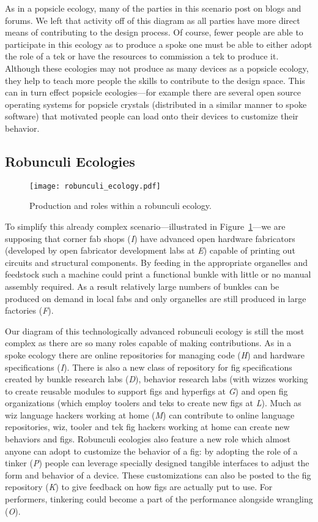 As in a popsicle ecology, many of the parties in this scenario post on blogs and forums. We left that activity off of this diagram as all parties have more direct means of contributing to the design process. Of course, fewer people are able to participate in this ecology as to produce a spoke one must be able to either adopt the role of a tek or have the resources to commission a tek to produce it. Although these ecologies may not produce as many devices as a popsicle ecology, they help to teach more people the skills to contribute to the design space. This can in turn effect popsicle ecologies---for example there are several open source operating systems for popsicle crystals (distributed in a similar manner to spoke software) that motivated people can load onto their devices to customize their behavior.

\subsection{Robunculi Ecologies}
%
\begin{figure}[b!]
  \centering
    \texttt{[image: robunculi\_ecology.pdf]}
  \caption{Production and roles within a robunculi ecology.}
  \label{fig:robunculi_ecology}
\end{figure}
%
To simplify this already complex scenario---illustrated in Figure~\ref{fig:robunculi_ecology}---we are supposing that corner fab shops (\emph{I}) have advanced open hardware fabricators (developed by open fabricator development labs at \emph{E}) capable of printing out circuits and structural components.
By feeding in the appropriate organelles and feedstock such a machine could print a functional bunkle with little or no manual assembly required.
As a result relatively large numbers of bunkles can be produced on demand in local fabs and only organelles are still produced in large factories (\emph{F}).

Our diagram of this technologically advanced robunculi ecology is still the most complex as there are so many roles capable of making contributions. 
As in a spoke ecology there are online repositories for managing code (\emph{H}) and hardware specifications (\emph{I}).
There is also a new class of repository for fig specifications created by bunkle research labs (\emph{D}), behavior research labs (with wizzes working to create reusable modules to support figs and hyperfigs at \emph{G}) and open fig organizations (which employ toolers and teks to create new figs at \emph{L}). 
Much as wiz language hackers working at home (\emph{M}) can contribute to online language repositories, wiz, tooler and tek fig hackers working at home can create new behaviors and figs.
Robunculi ecologies also feature a new role which almost anyone can adopt to customize the behavior of a fig: by adopting the role of a tinker (\emph{P}) people can leverage specially designed tangible interfaces to adjust the form and behavior of a device. 
These customizations can also be posted to the fig repository (\emph{K}) to give feedback on how figs are actually put to use.
For performers, tinkering could become a part of the performance alongside wrangling (\emph{O}).

